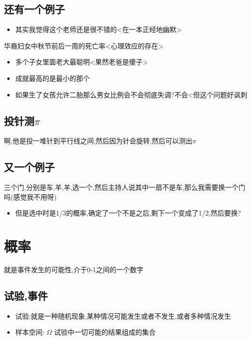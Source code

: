 \documentclass[11pt]{article}
\begin{document}
\subsection{还有一个例子}
\label{sec:orgd11d988}
\begin{itemize}
\item 其实我觉得这个老师还是很不错的<在一本正经地幽默>
\end{itemize}
华裔妇女中秋节前后一周的死亡率<心理效应的存在>
\begin{itemize}
\item 多个子女里面老大最聪明<果然老爸是傻子>
\item 成就最高的是最小的那个
\item 如果生了女孩允许二胎那么男女比例会不会彻底失调?不会<但这个问题好讽刺
\end{itemize}
\subsection{投针测\(\pi\)}
\label{sec:org29afaca}
啊,他是投一堆针到平行线之间,然后因为针会旋转,然后可以测出\(\pi\)
\subsection{又一个例子}
\label{sec:orgc45a607}
三个门,分别是车,羊,羊,选一个,然后主持人说其中一扇不是车,那么我需要换一个门吗(感觉我不用呀)
\begin{itemize}
\item 但是选中时是1/3的概率,确定了一个不是之后,剩下一个变成了1/2,然后要换?
\end{itemize}
\section{概率}
\label{sec:orgb2091c6}
就是事件发生的可能性,介于0-1之间的一个数字
\subsection{试验,事件}
\label{sec:orgc85ce76}
\begin{itemize}
\item 试验:就是一种随机现象,某种情况可能发生或者不发生,或者多种情况发生
\item 样本空间: \(\Omega\) 试验中一切可能的结果组成的集合
\end{itemize}
\end{document}
